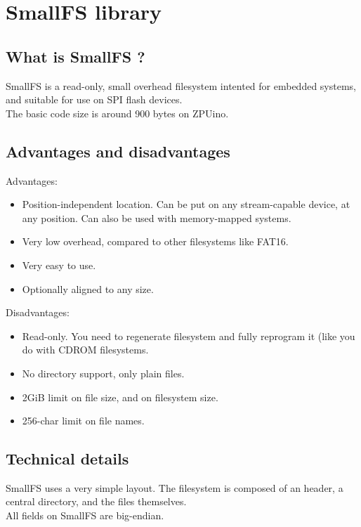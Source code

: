 \section{SmallFS library}

\subsection{What is SmallFS ?}
SmallFS is a read-only, small overhead filesystem intented for
embedded systems, and suitable for use on SPI flash devices.\\
The basic code size is around 900 bytes on ZPUino.


\subsection{Advantages and disadvantages}

Advantages:
\begin{itemize}
\item Position-independent location. Can be put on any stream-capable device,
at any position. Can also be used with memory-mapped systems.

\item Very low overhead, compared to other filesystems like FAT16.
\item Very easy to use.
\item Optionally aligned to any size.

\end{itemize}

Disadvantages:

\begin{itemize}
\item Read-only. You need to regenerate filesystem and fully reprogram it (like 
you do with CDROM filesystems.
\item No directory support, only plain files.
\item 2GiB limit on file size, and on filesystem size.
\item 256-char limit on file names.
\end{itemize}

\subsection{Technical details}

SmallFS uses a very simple layout. The filesystem is composed of an header,
a central directory, and the files themselves. \\
All fields on SmallFS are big-endian. \\

